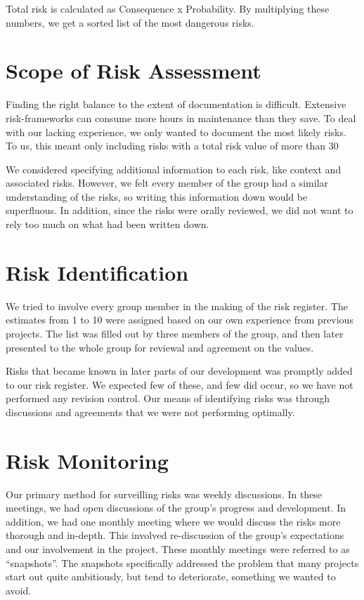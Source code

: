Total risk is calculated as Consequence x Probability. By multiplying
these numbers, we get a sorted list of the most dangerous risks. 

\section{Scope of Risk Assessment}
Finding the right balance to the extent of documentation is difficult.
Extensive risk-frameworks can consume more hours in maintenance than
they save. To deal with our lacking experience, we only wanted to
document the most likely risks. To us, this meant only including risks
with a total risk value of more than 30

We considered specifying additional information to each risk, like
context and associated risks. However, we felt every member of the
group had a similar understanding of the risks, so writing this
information down would be superfluous. In addition, since the risks
were orally reviewed, we did not want to rely too much on what had been
written down.

\section{Risk Identification}
We tried to involve every group member in the making of the risk
register. The estimates from 1 to 10 were assigned based on our own
experience from previous projects. The list was filled out by three
members of the group, and then later presented to the whole group for
reviewal and agreement on the values. 

Risks that became known in later parts of our development was promptly
added to our risk register. We expected few of these, and few did
occur, so we have not performed any revision control. Our means of identifying
risks was through discussions and agreements that we were not
performing optimally.

\section{Risk Monitoring}
Our primary method for surveilling risks was weekly discussions. In
these meetings, we had open discussions of the group's
progress and development. In addition, we had one monthly meeting where
we would discuss the risks more thorough and in-depth. This involved
re-discussion of the group's expectations and our
involvement in the project. These monthly meetings were referred to as
``snapshots''. The snapshots
specifically addressed the problem that many projects start out quite
ambitiously, but tend to deteriorate, something we wanted to avoid.

